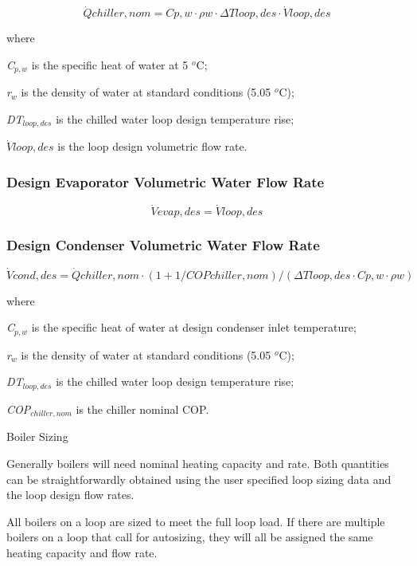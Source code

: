 \begin{equation}
\dot Qchiller,nom = Cp,w\cdot \rho w\cdot \Delta Tloop,des\cdot \dot Vloop,des
\end{equation}

where

\emph{C\(_{p,w}\)} is the specific heat of water at 5 \(^{o}\)C;

\emph{r\(_{w}\)} is the density of water at standard conditions (5.05 \(^{o}\)C);

\emph{DT\(_{loop,des}\)} is the chilled water loop design temperature rise;

\(\dot Vloop,des\) is the loop design volumetric flow rate.

\subsubsection{Design Evaporator Volumetric Water Flow Rate}\label{design-evaporator-volumetric-water-flow-rate}

\begin{equation}
\dot Vevap,des = \dot Vloop,des
\end{equation}

\subsubsection{Design Condenser Volumetric Water Flow Rate}\label{design-condenser-volumetric-water-flow-rate}

\begin{equation}
\dot Vcond,des = \dot Qchiller,nom\cdot (1 + 1/COPchiller,nom)/(\Delta Tloop,des\cdot Cp,w\cdot \rho w)
\end{equation}

where

\emph{C\(_{p,w}\)} is the specific heat of water at design condenser inlet temperature;

\emph{r\(_{w}\)} is the density of water at standard conditions (5.05 \(^{o}\)C);

\emph{DT\(_{loop,des}\)} is the chilled water loop design temperature rise;

\emph{COP\(_{chiller,nom}\)} is the chiller nominal COP.

Boiler Sizing

Generally boilers will need nominal heating capacity and rate. Both quantities can be straightforwardly obtained using the user specified loop sizing data and the loop design flow rates.

All boilers on a loop are sized to meet the full loop load. If there are multiple boilers on a loop that call for autosizing, they will all be assigned the same heating capacity and flow rate.


